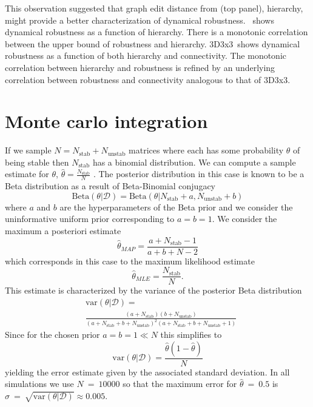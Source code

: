 This observation suggested that graph edit distance from  (top panel), hierarchy, might provide a better characterization of dynamical robustness. $\,$ shows dynamical robustness as a function of hierarchy. There is a monotonic correlation between the upper bound of robustness and hierarchy. 3D3x3$\,$ shows dynamical robustness as a function of both hierarchy and connectivity. The monotonic correlation between hierarchy and robustness is refined by an underlying correlation between robustness and connectivity analogous to that of 3D3x3.

\section{Monte carlo integration}\label{suppsec:montecarlo}
If we sample $N = N_{\mathrm{stab}} + N_{\mathrm{unstab}}$ matrices where each has some probability $\theta$ of being stable then $N_{\mathrm{stab}}$ has a binomial distribution. We can compute a sample estimate for $\theta$, $\hat{\theta} = \frac{N_{\mathrm{stab}}}{N}$ \cite{Murphy2012}. The posterior distribution in this case is known to be a Beta distribution as a result of Beta-Binomial conjugacy
$$
\mathrm{Beta}(\theta | \mathcal{D}) = \mathrm{Beta}(\theta | N_{\mathrm{stab}} + a, N_{\mathrm{unstab}} + b)
$$
where $a$ and $b$ are the hyperparameters of the Beta prior and we consider the uninformative uniform prior corresponding to $a=b=1$. We consider the maximum a posteriori estimate
$$\hat{\theta}_{MAP} = \frac{a + N_{\mathrm{stab}} - 1}{a + b + N - 2}$$
which corresponds in this case to the maximum likelihood estimate
$$
\hat{\theta}_{MLE} = \frac{N_{\mathrm{stab}}}{N}.
$$
This estimate is characterized by the variance of the posterior Beta distribution
\begin{align*}
&\mathrm{var}(\theta | \mathcal{D}) =\\
&\frac{(a+N_{\mathrm{stab}})(b+N_{\mathrm{unstab}})}{(a + N_{\mathrm{stab}} + b + N_{\mathrm{unstab}})^2(a + N_{\mathrm{stab}} + b + N_{\mathrm{unstab}}+1)}
\end{align*}
Since for the chosen prior $a=b=1 \ll N$ this simplifies to
$$
\mathrm{var}(\theta | \mathcal{D}) = \frac{\hat{\theta}(1-\hat{\theta})}{N}
$$
yielding the error estimate given by the associated standard deviation. In all simulations we use $N~=~10000$ so that the maximum error for $\hat{\theta}~=~0.5$ is $\sigma~=~\sqrt{\mathrm{var}(\theta | \mathcal{D})} \approx 0.005$.


